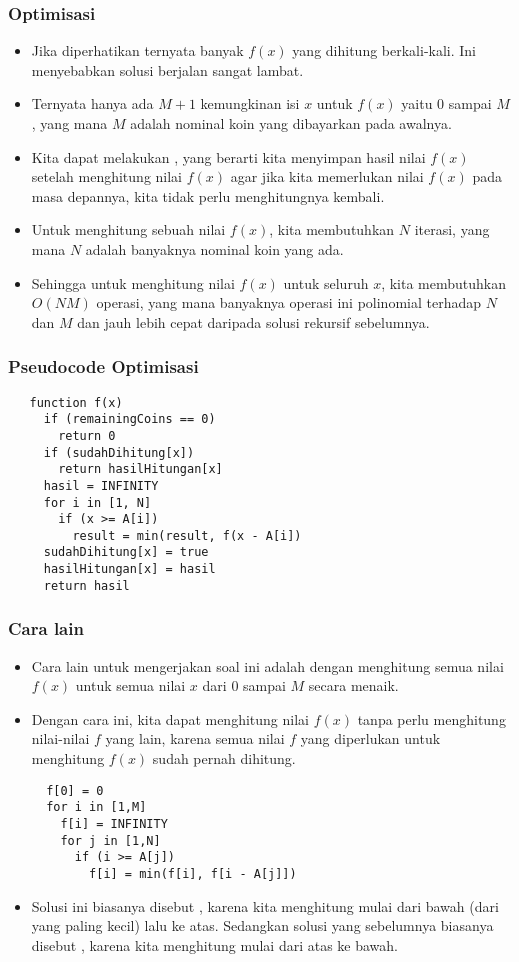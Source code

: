 \begin{frame}
\frametitle{Optimisasi}
\begin{itemize}
  \item Jika diperhatikan ternyata banyak $f(x)$ yang dihitung berkali-kali. Ini menyebabkan solusi berjalan sangat lambat.
  \item Ternyata hanya ada $M + 1$ kemungkinan isi $x$ untuk $f(x)$ yaitu $0$ sampai $M$, yang mana $M$ adalah nominal koin yang dibayarkan pada awalnya.
  \item Kita dapat melakukan , yang berarti kita menyimpan hasil nilai $f(x)$ setelah menghitung nilai $f(x)$ agar jika kita memerlukan nilai $f(x)$ pada masa depannya, kita tidak perlu menghitungnya kembali.
  \item Untuk menghitung sebuah nilai $f(x)$, kita membutuhkan $N$ iterasi, yang mana $N$ adalah banyaknya nominal koin yang ada.
  \item Sehingga untuk menghitung nilai $f(x)$ untuk seluruh $x$, kita membutuhkan $O(NM)$ operasi, yang mana banyaknya operasi ini polinomial terhadap $N$ dan $M$ dan jauh lebih cepat daripada solusi rekursif sebelumnya.
\end{itemize}
\end{frame}

\begin{frame} [fragile]
\frametitle{Pseudocode Optimisasi}
\begin{lstlisting}
   function f(x)
     if (remainingCoins == 0)
       return 0
     if (sudahDihitung[x])
       return hasilHitungan[x]
     hasil = INFINITY
     for i in [1, N]
       if (x >= A[i])
         result = min(result, f(x - A[i])
     sudahDihitung[x] = true
     hasilHitungan[x] = hasil
     return hasil
\end{lstlisting}
\end{frame}

\begin{frame} [fragile]
\frametitle{Cara lain}
\begin{itemize}
  \item Cara lain untuk mengerjakan soal ini adalah dengan menghitung semua nilai $f(x)$ untuk semua nilai $x$ dari $0$ sampai $M$ secara menaik.
  \item Dengan cara ini, kita dapat menghitung nilai $f(x)$ tanpa perlu menghitung nilai-nilai $f$ yang lain, karena semua nilai $f$ yang diperlukan untuk menghitung $f(x)$ sudah pernah dihitung.
\begin{lstlisting}
  f[0] = 0
  for i in [1,M]
    f[i] = INFINITY
    for j in [1,N]
      if (i >= A[j])
        f[i] = min(f[i], f[i - A[j]])
\end{lstlisting}
  \item Solusi ini biasanya disebut , karena kita menghitung mulai dari bawah (dari yang paling kecil) lalu ke atas. Sedangkan solusi yang sebelumnya biasanya disebut , karena kita menghitung mulai dari atas ke bawah.
\end{itemize}
\end{frame}

